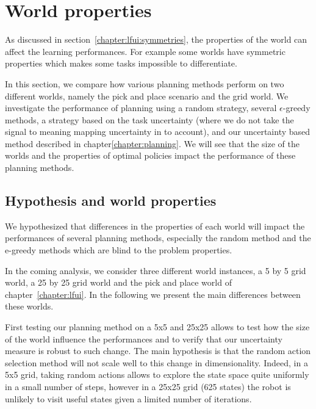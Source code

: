 
\section{World properties}
\label{chapter:limitations:wordlproperties}


As discussed in section~\ref{chapter:lfui:symmetries}, the properties of the world can affect the learning performances. For example some worlds have symmetric properties which makes some tasks impossible to differentiate.

In this section, we compare how various planning methods perform on two different worlds, namely the pick and place scenario and the grid world. We investigate the performance of planning using a random strategy, several $\epsilon$-greedy methods, a strategy based on the task uncertainty (where we do not take the signal to meaning mapping uncertainty in to account), and our uncertainty based method described in chapter\ref{chapter:planning}. We will see that the size of the worlds and the properties of optimal policies impact the performance of these planning methods.

\subsection{Hypothesis and world properties}

We hypothesized that differences in the properties of each world will impact the performances of several planning methods, especially the random method and the e-greedy methods which are blind to the problem properties.

In the coming analysis, we consider three different world instances, a 5 by 5 grid world, a 25 by 25 grid world and the pick and place world of chapter~\ref{chapter:lfui}. In the following we present the main differences between these worlds.

First testing our planning method on a 5x5 and 25x25 allows to test how the size of the world influence the performances and to verify that our uncertainty measure is robust to such change. The main hypothesis is that the random action selection method will not scale well to this change in dimensionality. Indeed, in a 5x5 grid, taking random actions allows to explore the state space quite uniformly in a small number of steps, however in a 25x25 grid (625 states) the robot is unlikely to visit useful states given a limited number of iterations.

